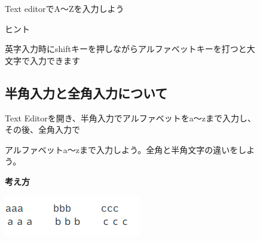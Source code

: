 \documentclass[a4paper,12pt]{jarticle}
\begin{document}
\begin{figure}[ht]
  \flushleft
  \theQuestion\label{Q:hasAnswer02-4}
  Text editorでA〜Zを入力しよう

  ヒント

  英字入力時にshiftキーを押しながらアルファベットキーを打つと大文字で入力できます
\end{figure}
\clearpage
\begin{figure}[ht]
  \subsection{\theExercise 半角入力と全角入力について}
  Text
  Editorを開き、半角入力でアルファベットをa〜zまで入力し、その後、全角入力で

  アルファベットa〜zまで入力しよう。全角と半角文字の違いをしよう。

  {\bf\large 考え方}

  \centering
  \includegraphics[width=5.978cm,height=1.773cm]{textbook-img066.png}

  \begin{minipage}{16.578cm}

    \bigskip


\end{minipage}
\end{figure}
\end{document}
